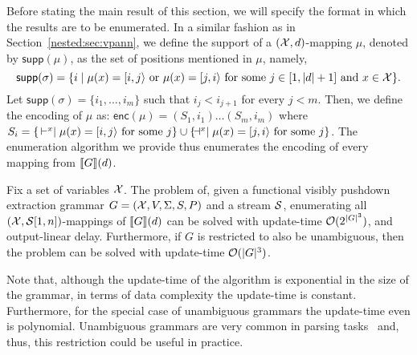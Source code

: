 Before stating the main result of this section, we will specify the format in which the results are to be enumerated. In a similar fashion as in Section~\ref{nested:sec:vpann}, we define the support of a $(\mathcal{X}, d)$-mapping $\mu$, denoted by $\textsf{supp}(\mu)$, as the set of positions mentioned in $\mu$, namely, 
\[
\textsf{supp}(\sigma) = \{i \mid \mu(x) = [i,j\rangle \text{ or } \mu(x) = [j,i\rangle\text{ for some }j\in[1,|d|+1]\text{ and }x\in \mathcal{X}\}.
\] 
Let $\textsf{supp}(\sigma) = \{i_1,\ldots, i_m\}$ such that $i_j < i_{j+1}$ for every $j < m$. 
Then, we define the encoding of $\mu$ as:
$
\textsf{enc}(\mu) = (S_1, i_1)\ldots (S_m, i_m)
$
where $S_i = \{\, \vdash^{x}\mid\mu(x) = [i,j\rangle\text{ for some }j\}\cup \{\!\dashv^{x}\mid\mu(x) = [j,i\rangle\text{ for some }j\}$.
The enumeration algorithm we provide thus enumerates the encoding of every mapping from ${\llbracket{G}\rrbracket}(d)$.

\begin{theorem}\label{nested:theo:spanners}
	Fix a set of variables $\mathcal{X}$. The problem of, given a functional visibly pushdown extraction grammar $G = (\mathcal{X}, V, \Sigma, S, P)$ and a stream $\mathcal{S}$, enumerating all $(\mathcal{X},\mathcal{S}[1,n])$-mappings of ${\llbracket{G}\rrbracket}(d)$ can be solved with update-time $\mathcal{O}(2^{|G|^3})$, and output-linear delay. Furthermore, if $G$ is restricted to also be unambiguous, then the problem can be solved with update-time $\mathcal{O}(|G|^3)$.
\end{theorem} 



Note that, although the update-time of the algorithm is exponential in the size of the grammar, in terms of data complexity the update-time is constant. Furthermore, for the special case of unambiguous grammars the update-time even is polynomial. Unambiguous grammars are very common in parsing tasks~\cite{aho1986compilers} and, thus, this restriction could be useful in practice. 




